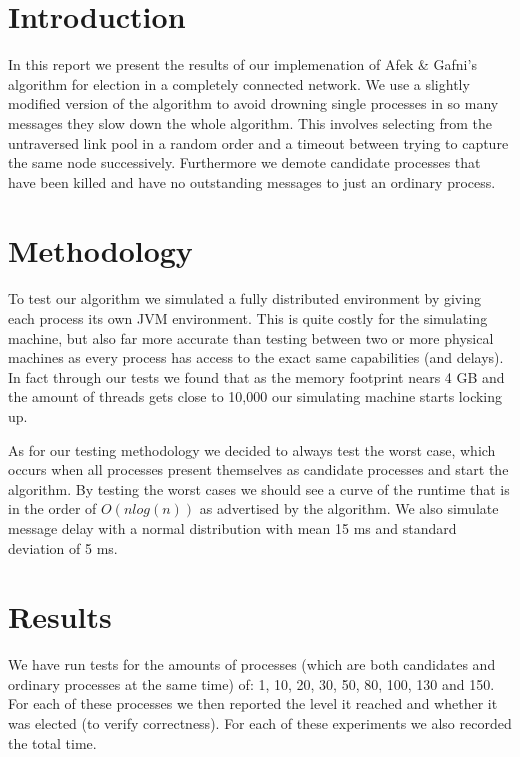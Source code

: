 \documentclass[12pt]{article}
\begin{document}
\setlength\headheight{0.8in}
\setlength\topmargin{-0.6in}
\setlength\textheight{9.0in}
\setlength\parindent{0pt}

\section{Introduction}
In this report we present the results of our implemenation of Afek \& Gafni's algorithm for election in a completely connected network.
We use a slightly modified version of the algorithm to avoid drowning single processes in so many messages they slow down the
whole algorithm. This involves selecting from the untraversed link pool in a random order and a timeout between trying to capture
the same node successively. Furthermore we demote candidate processes that have been killed and have no outstanding messages
to just an ordinary process.

\section{Methodology}
To test our algorithm we simulated a fully distributed environment by giving each process its own JVM environment.
This is quite costly for the simulating machine, but also far more accurate than testing between two or more
physical machines as every process has access to the exact same capabilities (and delays).
In fact through our tests we found that as the memory footprint nears 4 GB and the amount of threads gets close
to 10,000 our simulating machine starts locking up.

\quad As for our testing methodology we decided to always test the worst case, which occurs when all processes present themselves
as candidate processes and start the algorithm. By testing the worst cases we should see a curve of the runtime
that is in the order of $O(n log(n))$ as advertised by the algorithm. We also simulate message delay with a normal 
distribution with mean 15 ms and standard deviation of 5 ms.

\section{Results}
We have run tests for the amounts of processes (which are both candidates and ordinary processes at the same time) of:
1, 10, 20, 30, 50, 80, 100, 130 and 150. For each of these processes we then reported the level it reached and whether
it was elected (to verify correctness). For each of these experiments we also recorded the total time.
\end{document}
